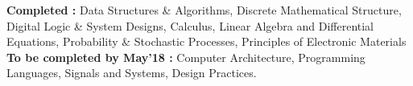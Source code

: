 

\begin{cvparagraph}

\textbf{Completed :} Data Structures \& Algorithms, Discrete Mathematical Structure, Digital
Logic \& System Designs, Calculus, Linear Algebra and Differential Equations,
Probability \& Stochastic Processes, Principles of Electronic Materials \newline
\textbf{To be completed by May’18 :} Computer Architecture, Programming
Languages, Signals and Systems, Design Practices.
\end{cvparagraph}
